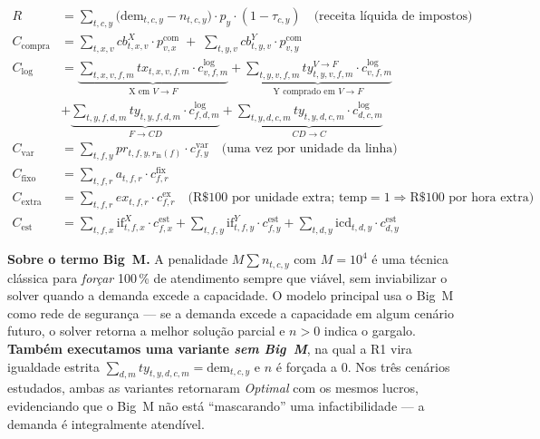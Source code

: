 \documentclass[11pt,a4paper]{article}
\begin{document}
{\small
\begin{align*}
R               &= \sum_{t,c,y}\bigl(\text{dem}_{t,c,y} - n_{t,c,y}\bigr)\cdot p_y \cdot (1-\tau_{c,y}) \quad \text{(receita líquida de impostos)} \\[2pt]
C_{\text{compra}}&= \sum_{t,x,v} cb^X_{t,x,v}\cdot p^{\text{com}}_{v,x} \;+\; \sum_{t,y,v} cb^Y_{t,y,v}\cdot p^{\text{com}}_{v,y} \\[2pt]
C_{\text{log}}  &= \underbrace{\sum_{t,x,v,f,m} tx_{t,x,v,f,m}\cdot c^{\text{log}}_{v,f,m}}_{\text{X em } V{\to}F}
                 +\underbrace{\sum_{t,y,v,f,m} ty^{V\to F}_{t,y,v,f,m}\cdot c^{\text{log}}_{v,f,m}}_{\text{Y comprado em } V{\to}F} \\
                & +\underbrace{\sum_{t,y,f,d,m} ty_{t,y,f,d,m}\cdot c^{\text{log}}_{f,d,m}}_{F{\to}CD}
                 +\underbrace{\sum_{t,y,d,c,m} ty_{t,y,d,c,m}\cdot c^{\text{log}}_{d,c,m}}_{CD{\to}C} \\[2pt]
C_{\text{var}}  &= \sum_{t,f,y} pr_{t,f,y,r_{\text{in}}(f)}\cdot c^{\text{var}}_{f,y} \quad\text{(uma vez por unidade da linha)} \\[2pt]
C_{\text{fixo}} &= \sum_{t,f,r} a_{t,f,r}\cdot c^{\text{fix}}_{f,r} \\[2pt]
C_{\text{extra}}&= \sum_{t,f,r} ex_{t,f,r}\cdot c^{\text{ex}}_{f,r} \quad\text{(R\$ 100 por unidade extra; }\text{temp}=1\Rightarrow\text{R\$ 100 por hora extra)} \\[2pt]
C_{\text{est}}  &= \sum_{t,f,x} \text{if}^X_{t,f,x}\cdot c^{\text{est}}_{f,x}
                 +\sum_{t,f,y} \text{if}^Y_{t,f,y}\cdot c^{\text{est}}_{f,y}
                 +\sum_{t,d,y} \text{icd}_{t,d,y}\cdot c^{\text{est}}_{d,y}
\end{align*}
}

\noindent\textbf{Sobre o termo Big~M.} A penalidade $M\sum n_{t,c,y}$ com $M = 10^4$ é uma técnica clássica para \emph{forçar} 100\,\% de atendimento sempre que viável, sem inviabilizar o solver quando a demanda excede a capacidade. O modelo principal usa o Big~M como rede de segurança --- se a demanda excede a capacidade em algum cenário futuro, o solver retorna a melhor solução parcial e $n > 0$ indica o gargalo. \textbf{Também executamos uma variante \emph{sem Big~M}}, na qual a R1 vira igualdade estrita $\sum_{d,m} ty_{t,y,d,c,m} = \text{dem}_{t,c,y}$ e $n$ é forçada a 0. Nos três cenários estudados, ambas as variantes retornaram \emph{Optimal} com os mesmos lucros, evidenciando que o Big~M não está ``mascarando'' uma infactibilidade --- a demanda é integralmente atendível.
\end{document}
